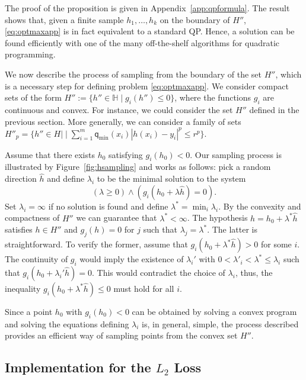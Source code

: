 \documentclass[twoside,11pt]{article}
\def\Hset{\mathbb{H}}
\newcommand{\h}{\widehat}
\newcommand{\1}{\mat{1}}
\newcommand{\qq}{{\mathsf q}}
\newcommand{\qmin}{{\qq_\text{min}}}
\begin{document}
The proof of the proposition is given in Appendix~\ref{app:qpformula}.
The result shows that, given a finite sample $h_1, \ldots, h_k$ on the
boundary of $H''$, \eqref{eq:optmaxapp} is in fact equivalent to a
standard QP. Hence, a solution can be found efficiently with one of
the many off-the-shelf algorithms for quadratic programming.

We now describe the process of sampling from the boundary of the set
$H''$, which is a necessary step for defining problem
\eqref{eq:optmaxapp}. We consider compact sets of the form
 $H'':= \{h'' \in \Hset \; | \; g_i(h'') \leq 0\}$, where the functions $g_i$
are continuous and convex. For instance, we could consider the set
$H''$ defined in the previous section. More generally, we can consider
a family of sets
$H''_p = \{h'' \in H | \; | \; \sum_{i=1}^m \qmin(x_i)|h(x_i) -y_i|^p
\leq r^p\}$.

Assume that there exists $h_0$ satisfying $g_i(h_0) < 0$. Our sampling
process is illustrated by Figure~\ref{fig:hsampling} and works as
follows: pick a random direction $\h h$ and define $\lambda_i$ to be
the minimal solution to the system
\begin{equation*}
  (\lambda \geq 0) \wedge (g_i(h_0 + \lambda \h{h}) = 0).
\end{equation*}
Set $\lambda_i = \infty$ if no solution is found and define
$\lambda^* = \min_i \lambda_i$. By the convexity and compactness of
$H''$ we can guarantee that $\lambda^* < \infty$. The hypothesis
$h =h_0 + \lambda^* \h h$ satisfies
$h \in H''$ and $g_j(h) = 0$ for $j$
such that $\lambda_j = \lambda^*$. The latter is straightforward. To
verify the former, assume that $g_i(h_0 + \lambda^* \h h) > 0$ for
some $i$. The continuity of $g_i$ would imply the existence of
$\lambda_i'$ with $0 < \lambda'_i < \lambda^* \leq \lambda _i$ such
that $g_i(h_0 + \lambda_i' \h h) = 0$. This would contradict the
choice of $\lambda_i$, thus, the inequality
 $g_i(h_0 + \lambda^* \h h) \leq 0$ must hold for all $i$.

Since a point $h_0$ with $g_i(h_0) < 0$ can be obtained by solving a
convex program and solving the equations defining $\lambda_i$ is, in
general, simple, the process described provides an efficient way of
sampling points from the convex set $H''$.

\subsection{Implementation for the \texorpdfstring{$L_2$}{L2} Loss}
\end{document}
